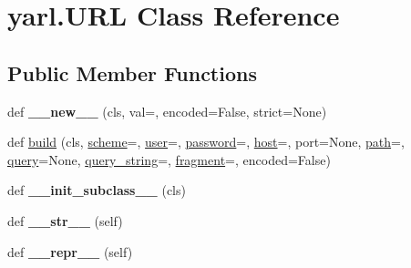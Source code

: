 \hypertarget{classyarl_1_1_u_r_l}{}\section{yarl.\+U\+RL Class Reference}
\label{classyarl_1_1_u_r_l}
\subsection*{Public Member Functions}
\begin{DoxyCompactItemize}
\item 
\mbox{\label{classyarl_1_1_u_r_l_a5ab062046eaf150f8eb0885aeeeb4c12}} 
def {\bfseries \+\_\+\+\_\+new\+\_\+\+\_\+} (cls, val=\textquotesingle{}\textquotesingle{}, encoded=False, strict=None)
\item 
def \hyperlink{classyarl_1_1_u_r_l_a1c2c69661e6243b26ced0c91bcbba17f}{build} (cls, \hyperlink{classyarl_1_1_u_r_l_a8b60f8bedeae832f0a6b829d51f67d72}{scheme}=\textquotesingle{}\textquotesingle{}, \hyperlink{classyarl_1_1_u_r_l_ab04fc87f41bbf84de1c3af564afa6e2f}{user}=\textquotesingle{}\textquotesingle{}, \hyperlink{classyarl_1_1_u_r_l_a634441286d0daca5528ba5f48373ac21}{password}=\textquotesingle{}\textquotesingle{}, \hyperlink{classyarl_1_1_u_r_l_ae650199d67e0c5092c25b22c14caed54}{host}=\textquotesingle{}\textquotesingle{}, port=None, \hyperlink{classyarl_1_1_u_r_l_ad0f8dd2dcbe14c8e29084f73148b584e}{path}=\textquotesingle{}\textquotesingle{}, \hyperlink{classyarl_1_1_u_r_l_a10122ffc37115834b1e40e10b92f24cc}{query}=None, \hyperlink{classyarl_1_1_u_r_l_ae0c2703179536721d215c1fb7f46b82e}{query\+\_\+string}=\textquotesingle{}\textquotesingle{}, \hyperlink{classyarl_1_1_u_r_l_a50c3724e1a627325be8f496cda2f613b}{fragment}=\textquotesingle{}\textquotesingle{}, encoded=False)
\item 
\mbox{\label{classyarl_1_1_u_r_l_a327d6d9498321dfb593135d137db44de}} 
def {\bfseries \+\_\+\+\_\+init\+\_\+subclass\+\_\+\+\_\+} (cls)
\item 
\mbox{\label{classyarl_1_1_u_r_l_a4703bb3e770a776f197e6b937cd9e765}} 
def {\bfseries \+\_\+\+\_\+str\+\_\+\+\_\+} (self)
\item 
\mbox{\label{classyarl_1_1_u_r_l_ad1529cd7037ab615f16098d653793fb0}} 
def {\bfseries \+\_\+\+\_\+repr\+\_\+\+\_\+} (self)

\end{DoxyCompactItemize}
